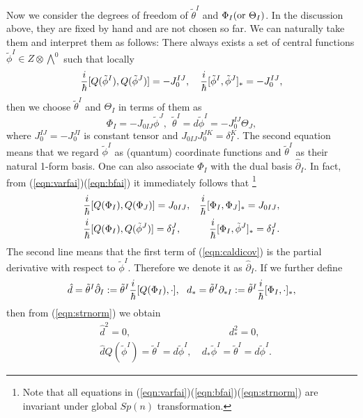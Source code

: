 \documentclass[10pt,a4paper]{article}
\def\h{\hbar}
\begin{document}
Now we consider the degrees of freedom of ${\tilde\theta}^I$ and $\Phi_I({\rm or}\  \Theta_I)$.
In the discussion above, they are fixed by hand and are not chosen so far. We can naturally take them and interpret them as follows: There always exists a set of central functions ${\tilde \phi}^I\in Z\otimes {\scriptstyle \bigwedge}^0$ such that locally
\begin{equation}
\label{eqn:varfai}
{i\over\h}[Q({\tilde \phi}^I),Q({\tilde \phi}^J)]=-J_0^{IJ},\quad {i\over\h}[{\tilde \phi}^I,{\tilde \phi}^J]_*=-J_0^{IJ},
\end{equation}
then we choose ${\tilde \theta}^I$ and $\Theta_I$ in terms of them as
\begin{equation}
\label{eqn:bfai}
 \Phi_I=-J_{0IJ}{\tilde \phi}^J, \ \ {\tilde \theta}^I=d{\tilde \phi}^I=-J_0^{IJ}\Theta_J,
\end{equation}
where $J_0^{IJ}=-J_0^{JI}$ is constant tensor and $J_{0IJ}J_0^{JK}=\delta^K_I$. 
The second equation means that we regard ${\tilde \phi}^I$ as (quantum) coordinate functions and ${\tilde \theta}^I$ as their natural 1-form basis. One can also associate $\Phi_I$ with the dual basis ${\hat \partial}_I$. In fact, from (\ref{eqn:varfai})(\ref{eqn:bfai}) it immediately follows that
\footnote{Note that all equations in (\ref{eqn:varfai})(\ref{eqn:bfai})(\ref{eqn:strnorm}) are invariant under global $Sp(n)$ transformation.}
\begin{eqnarray}
\label{eqn:strnorm}
&{i\over\h}[Q(\Phi_I),Q(\Phi_J)]=J_{0IJ},&{i\over\h}[\Phi_I,\Phi_J]_*=J_{0IJ},\nonumber\\
&{i\over\h}[Q(\Phi_I),Q({\tilde \phi}^J)]=\delta_I^J,
&{i\over\h}[\Phi_I,{\tilde \phi}^J]_*=\delta_I^J.
\end{eqnarray}
The second line means that the first term of (\ref{eqn:caldicov}) is the partial derivative with respect to ${\tilde \phi}^I$. 
Therefore we denote it as ${\hat \partial}_I$. If we further define  
\begin{equation}
\label{eqn:dd}
{\hat d}={\tilde \theta}^I{\hat \partial}_I:={\tilde \theta}^I{i\over\h}[Q(\Phi_I),\cdot],\ \ d_*={\tilde \theta}^I\partial_{*I}:={\tilde \theta}^I{i\over\h}[\Phi_I,\cdot ]_*,
\end{equation}
then from (\ref{eqn:strnorm}) we obtain
\begin{eqnarray}
\label{eqn:hth}
&{\hat d}^2=0,&\quad\quad\quad d_*^2=0,\nonumber\\
&{\hat d}Q({\tilde \phi}^I)={\tilde \theta}^I=d{\tilde \phi}^I,&
\ d_*{\tilde \phi}^I={\tilde \theta}^I=d{\tilde \phi}^I.
\end{eqnarray}
\end{document}

